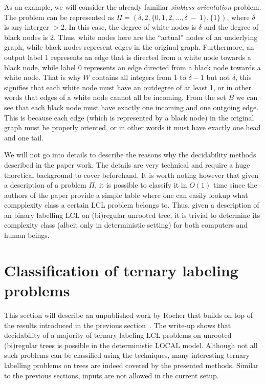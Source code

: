 As an example, we will consider the already familiar \emph{sinkless orientation}
problem. The problem can be represented as $\Pi = (\delta, 2, \{0, 1, 2, \dots, \delta~-~1\}, \{ 1 \})$,
where $\delta$ is any interger $> 2$. In this case, the degree of white nodes is
$\delta$ and the degree of black nodes is $2$. Thus, white nodes here are the ``actual''
nodes of an underlying graph, while black nodes represent edges in the original graph.
Furthermore, an output label $1$ represents an edge
that is directed from a white node towards a black node, while label $0$ represents
an edge directed from a black node towards a white node. That is why
$W$ contains all integers from 1 to $\delta - 1$ but not $\delta$,
this signifies that each white node must have an outdegree of at least 1,
or in other words that edges of a white node cannot all be incoming.
From the set $B$ we can see that each black node must have 
exactly one incoming and one outgoing edge. This is because each edge (which is represented by a black node)
in the original graph must be properly oriented, or in other words it must
have exactly one head and one tail.

We will not go into details to describe the reasons why the decidability methods
described in the paper work. The details are very technical and require a huge
thoretical background to cover beforehand. It is worth noting however that
given a description of a problem $\Pi$, it is possible to classify it in $O(1)$
time since the authors of the paper provide a simple table where one can
easily lookup what compplexity class a certain LCL problem belongs to. Thus,
given a description of an binary labelling LCL on (bi)regular unrooted tree,
it is trivial to determine its complexity class (albeit only in deterministic setting)
for both computers and human beings.

\section{Classification of ternary labeling problems}

This section will describe an unpublished work by Rocher that builds on top
of the results introduced in the previous section~\cite{Rocher2020doc, Rocher2020clas}.
The write-up shows that decidability of a majority of ternary labeling LCL problems on unrooted
(bi)regular trees is possible in the deterministic LOCAL model. Although not all such problems
can be classified using the techniques, many interesting ternary labelling problems on trees
are indeed covered by the presented methods.
Similar to the previous sections, inputs are not allowed in the current setup.

